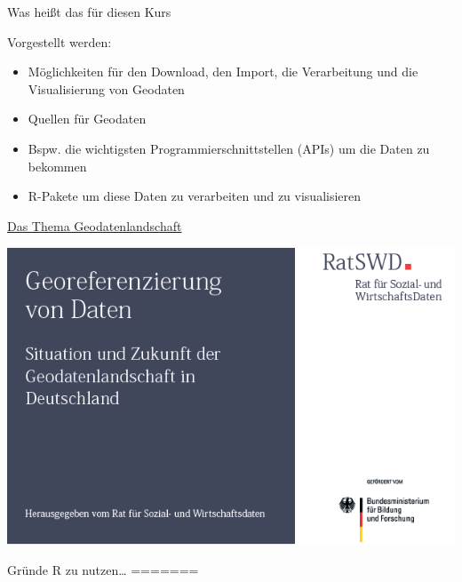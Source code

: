 \documentclass[ignorenonframetext,]{beamer}
\providecommand{\tightlist}{%
  \setlength{\itemsep}{0pt}\setlength{\parskip}{0pt}}
\begin{document}
\begin{frame}{Was heißt das für diesen Kurs}

\begin{block}{Vorgestellt werden:}

\begin{itemize}
\tightlist
\item
  Möglichkeiten für den Download, den Import, die Verarbeitung und die
  Visualisierung von Geodaten
\end{itemize}

\begin{itemize}
\item
  Quellen für Geodaten
\item
  Bspw. die wichtigsten Programmierschnittstellen (APIs) um die Daten zu
  bekommen
\item
  R-Pakete um diese Daten zu verarbeiten und zu visualisieren
\end{itemize}

\end{block}

\end{frame}

\begin{frame}{\href{https://www.ratswd.de/dl/downloads/RatSWD_Geodatenbericht.pdf}{Das
Thema Geodatenlandschaft}}

\includegraphics{figure/BildRatSWDBericht.png}

\end{frame}

\begin{frame}{Gründe R zu nutzen\ldots{}}
=======
\end{frame}
\end{document}
